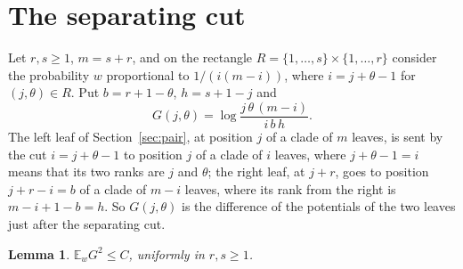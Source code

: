 \documentclass[11pt]{amsart}
\newtheorem{lemma}[theorem]{Lemma}
\theoremstyle{remark}
\numberwithin{equation}{section}
\newcommand{\E}{\mathbb E}
\begin{document}
\section{The separating cut}\label{sec:cut}

Let $r,s\ge1$, $m=s+r$, and on the rectangle $R=\{1,\dots,s\}\times\{1,\dots,r\}$ consider the probability $w$ proportional to $1/(i(m-i))$, where $i=j+\theta-1$ for $(j,\theta)\in R$. Put $b=r+1-\theta$, $h=s+1-j$ and
\[
G(j,\theta)=\log\frac{j\,\theta\,(m-i)}{i\,b\,h}.
\]
The left leaf of Section~\ref{sec:pair}, at position $j$ of a clade of $m$ leaves, is sent by the cut $i=j+\theta-1$ to position $j$ of a clade of $i$ leaves, where $j+\theta-1=i$ means that its two ranks are $j$ and $\theta$; the right leaf, at $j+r$, goes to position $j+r-i=b$ of a clade of $m-i$ leaves, where its rank from the right is $m-i+1-b=h$. So $G(j,\theta)$ is the difference of the potentials of the two leaves just after the separating cut.

\begin{lemma}\label{lem:rect}
$\E_wG^2\le C$, uniformly in $r,s\ge1$.
\end{lemma}
\end{document}
